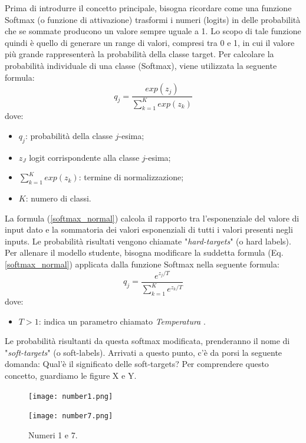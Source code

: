 Prima di introdurre il concetto principale, bisogna ricordare come una 
funzione Softmax (o funzione di attivazione) trasformi i numeri (logits) in 
delle probabilità che se sommate producono un valore sempre uguale a 1.  
Lo scopo di tale funzione quindi è quello di generare un range di valori, 
compresi tra 0 e 1, in cui il valore più grande rappresenterà la probabilità 
della classe target. Per calcolare la probabilità individuale di una classe 
(Softmax), viene utilizzata la seguente formula:
\begin{equation}\label{softmax_normal}
    q_j = \frac{exp(z_j)}{\sum_{k=1}^K exp(z_k)}
\end{equation}
dove:
\begin{itemize}
    \item $q_j$: probabilità della classe $j$-esima;
    \item $z_J$ logit corrispondente alla classe $j$-esima;
    \item $\sum_{k=1}^K exp(z_k)$: termine di normalizzazione;
    \item $K$: numero di classi.
\end{itemize}
La formula (\ref{softmax_normal}) calcola il rapporto tra l'esponenziale del valore di input 
dato e la sommatoria dei valori esponenziali di tutti i valori presenti negli 
inputs. Le probabilità risultati vengono chiamate "\emph{hard-targets}" (o hard 
labels). Per allenare il modello studente, bisogna modificare la suddetta 
formula (Eq. \ref{softmax_normal}) applicata dalla funzione Softmax nella seguente formula:
\begin{equation}
    q_j = \frac{e^{z_j/T}}{\sum_{k=1}^K e^{z_k/T}}
\end{equation}
dove:
\begin{itemize}
    \item $T>1$: indica un parametro chiamato \emph{Temperatura} \cite{marino2021compact}.
\end{itemize}
Le probabilità risultanti da questa softmax modificata, prenderanno il nome 
di "\emph{soft-targets}" (o soft-labels). Arrivati a questo punto, c'è da porsi la 
seguente domanda: Qual'è il significato delle soft-targets? Per comprendere 
questo concetto, guardiamo le figure X e Y.
\begin{figure}[]
    \begin{minipage}[t]{.45\textwidth}
        \centering
        \texttt{[image: number1.png]}
    \end{minipage}
    \hfill
    \begin{minipage}[t]{.45\textwidth}
        \centering
        \texttt{[image: number7.png]}
    \end{minipage}  
    \caption{Numeri 1 e 7.}
    \label{numbers_Mnist}
\end{figure}
